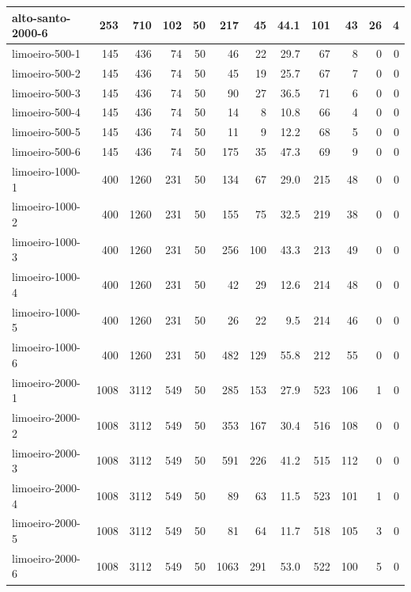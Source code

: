 \begin{landscape}
\begin{table}[!ht]
{\begin{tabular}{lrrrrrrrrrrr}
        alto-santo-2000-6 & 253  & 710  & 102 & 50 & 217  & 45  & 44.1 & 101 & 43  & 26 & 4 \\ \hline
        limoeiro-500-1    & 145  & 436  & 74  & 50 & 46   & 22  & 29.7 & 67  & 8   & 0  & 0 \\
        limoeiro-500-2    & 145  & 436  & 74  & 50 & 45   & 19  & 25.7 & 67  & 7   & 0  & 0 \\
        limoeiro-500-3    & 145  & 436  & 74  & 50 & 90   & 27  & 36.5 & 71  & 6   & 0  & 0 \\
        limoeiro-500-4    & 145  & 436  & 74  & 50 & 14   & 8   & 10.8 & 66  & 4   & 0  & 0 \\
        limoeiro-500-5    & 145  & 436  & 74  & 50 & 11   & 9   & 12.2 & 68  & 5   & 0  & 0 \\
        limoeiro-500-6    & 145  & 436  & 74  & 50 & 175  & 35  & 47.3 & 69  & 9   & 0  & 0 \\ 
        limoeiro-1000-1   & 400  & 1260 & 231 & 50 & 134  & 67  & 29.0 & 215 & 48  & 0  & 0 \\
        limoeiro-1000-2   & 400  & 1260 & 231 & 50 & 155  & 75  & 32.5 & 219 & 38  & 0  & 0 \\
        limoeiro-1000-3   & 400  & 1260 & 231 & 50 & 256  & 100 & 43.3 & 213 & 49  & 0  & 0 \\
        limoeiro-1000-4   & 400  & 1260 & 231 & 50 & 42   & 29  & 12.6 & 214 & 48  & 0  & 0 \\
        limoeiro-1000-5   & 400  & 1260 & 231 & 50 & 26   & 22  & 9.5  & 214 & 46  & 0  & 0 \\
        limoeiro-1000-6   & 400  & 1260 & 231 & 50 & 482  & 129 & 55.8 & 212 & 55  & 0  & 0 \\ 
        limoeiro-2000-1   & 1008 & 3112 & 549 & 50 & 285  & 153 & 27.9 & 523 & 106 & 1  & 0 \\
        limoeiro-2000-2   & 1008 & 3112 & 549 & 50 & 353  & 167 & 30.4 & 516 & 108 & 0  & 0 \\
        limoeiro-2000-3   & 1008 & 3112 & 549 & 50 & 591  & 226 & 41.2 & 515 & 112 & 0  & 0 \\
        limoeiro-2000-4   & 1008 & 3112 & 549 & 50 & 89   & 63  & 11.5 & 523 & 101 & 1  & 0 \\
        limoeiro-2000-5   & 1008 & 3112 & 549 & 50 & 81   & 64  & 11.7 & 518 & 105 & 3  & 0 \\
        limoeiro-2000-6   & 1008 & 3112 & 549 & 50 & 1063 & 291 & 53.0 & 522 & 100 & 5  & 0 \\ \hline
        \end{tabular}
    }
    \end{table}
\end{landscape}

